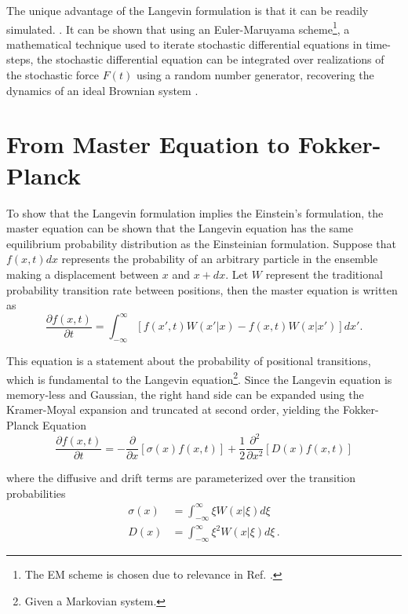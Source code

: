 The unique advantage of the Langevin formulation is that it can be readily simulated. \cite{geyer_many-particle_2011,millanNumericalSimulationsConfined2023}. It can be shown that using an Euler-Maruyama scheme\footnote{The EM scheme is chosen due to relevance in Ref. \cite{millanNumericalSimulationsConfined2023}.}, a mathematical technique used to iterate stochastic differential equations in time-steps, the stochastic differential equation can be integrated over realizations of the stochastic force $F(t)$ using a random number generator, recovering the dynamics of an ideal Brownian system \cite{millanNumericalSimulationsConfined2023}.

\clearpage
\section{From Master Equation to Fokker-Planck}

To show that the Langevin formulation implies the Einstein's formulation, the master equation can be shown that the Langevin equation has the same equilibrium probability distribution as the Einsteinian formulation. Suppose that $f(x,t)dx$ represents the probability of an arbitrary particle in the ensemble making a displacement between $x$ and $x + dx$. Let $W$ represent the traditional probability transition rate between positions, then the master equation is written as
\begin{equation}
	\frac{\partial f(x,t)}{\partial t} = \int_{-\infty}^\infty \left[ f(x', t)W(x'|x) - f(x, t)W(x|x')\right] dx'.
\end{equation}

This equation is a statement about the probability of positional transitions, which is fundamental to the Langevin equation\footnote{Given a Markovian system.}\cite{vankampen2007stochastic}. Since the Langevin equation is memory-less and Gaussian, the right hand side can be expanded using the Kramer-Moyal expansion and truncated at second order, yielding the Fokker-Planck Equation \cite{vankampen2007stochastic}
\begin{equation}\label{eqn:fokkerplank}
	\frac{\partial f(x,t)}{\partial t} = - \frac{\partial }{\partial x}\left[\sigma(x) f(x,t)\right] + \frac{1}{2}\frac{\partial^2 }{\partial x^2}\left[D(x) f(x,t)\right]
\end{equation}

where the diffusive and drift terms are parameterized over the transition probabilities
\begin{equation}
	\begin{aligned}
		\sigma(x) &= \int_{-\infty}^\infty \xi W(x| \xi)d\xi\\
		D(x) & = \int_{-\infty}^\infty \xi^2 W(x| \xi)d\xi \,.
	\end{aligned}
\end{equation}

